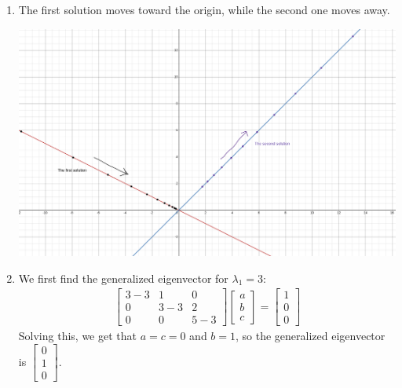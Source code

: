 \documentclass[12pt]{article}
\begin{document}
\begin{enumerate}
    \item The first solution moves toward the origin, while the second one moves away.
    \begin{center}
        \includegraphics[width=15.4cm]{img/phase}
    \end{center}

    \item We first find the generalized eigenvector for $\lambda_1=3$:
          \begin{gather*}
              \begin{bmatrix}
                  3-3 & 1 & 0 \\
                  0 & 3-3 & 2 \\
                  0 & 0 & 5-3   
              \end{bmatrix}\begin{bmatrix}a \\ b \\ c\end{bmatrix}=
              \begin{bmatrix}1 \\ 0 \\ 0\end{bmatrix}
          \end{gather*}
          Solving this, we get that $a=c=0$ and $b=1$, so the generalized eigenvector is $\boxed{\begin{bmatrix}0 \\ 1 \\ 0\end{bmatrix}}$.


\end{enumerate}
\end{document}
